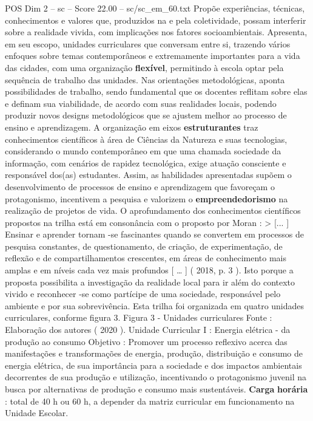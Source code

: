 \begin{textsample}{POS Dim 2 – sc – Score 22.00 – sc/sc\_em\_60.txt}
Propõe experiências, técnicas, conhecimentos e valores que, produzidos na e pela coletividade, possam interferir sobre a realidade vivida, com implicações nos fatores socioambientais.
Apresenta, em seu escopo, unidades curriculares que conversam entre si, trazendo vários enfoques sobre temas contemporâneos e extremamente importantes para a vida das cidades, com uma organização \textbf{flexível}, permitindo à escola optar pela sequência de trabalho das unidades.
Nas orientações metodológicas, aponta possibilidades de trabalho, sendo fundamental que os docentes reflitam sobre elas e definam sua viabilidade, de acordo com suas realidades locais, podendo produzir novos designs metodológicos que se ajustem melhor ao processo de ensino e aprendizagem.
A organização em eixos \textbf{estruturantes} traz conhecimentos científicos à área de Ciências da Natureza e suas tecnologias, considerando o mundo contemporâneo em que uma chamada sociedade da informação, com cenários de rapidez tecnológica, exige atuação consciente e responsável dos(as) estudantes.
Assim, as habilidades apresentadas supõem o desenvolvimento de processos de ensino e aprendizagem que favoreçam o protagonismo, incentivem a pesquisa e valorizem o \textbf{empreendedorismo} na realização de projetos de vida.
O aprofundamento dos conhecimentos científicos propostos na trilha está em consonância com o proposto por Moran : > [... ] Ensinar e aprender tornam -se fascinantes quando se convertem em processos de pesquisa constantes, de questionamento, de criação, de experimentação, de reflexão e de compartilhamentos crescentes, em áreas de conhecimento mais amplas e em níveis cada vez mais profundos [ … ] ( 2018, p. 3 ).
Isto porque a proposta possibilita a investigação da realidade local para ir além do contexto vivido e reconhecer -se como partícipe de uma sociedade, responsável pelo ambiente e por sua sobrevivência.
Esta trilha foi organizada em quatro unidades curriculares, conforme figura 3.
Figura 3 - Unidades curriculares Fonte : Elaboração dos autores ( 2020 ).
Unidade Curricular I : Energia elétrica - da produção ao consumo Objetivo : Promover um processo reflexivo acerca das manifestações e transformações de energia, produção, distribuição e consumo de energia elétrica, de sua importância para a sociedade e dos impactos ambientais decorrentes de sua produção e utilização, incentivando o protagonismo juvenil na busca por alternativas de produção e consumo mais sustentáveis. \textbf{Carga} \textbf{horária} : total de 40 h ou 60 h, a depender da matriz curricular em funcionamento na Unidade Escolar.

\end{textsample}
